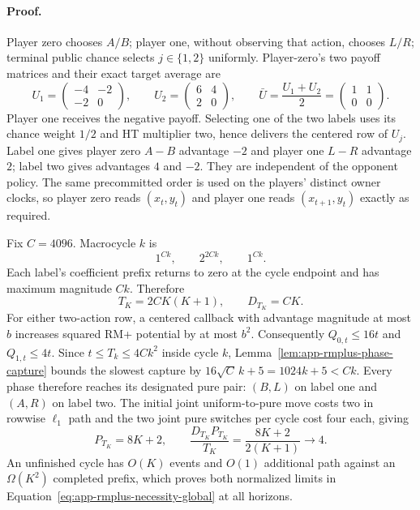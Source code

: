 \paragraph{Proof.}
Player zero chooses $A/B$; player one, without observing that action, chooses
$L/R$; terminal public chance selects $j\in\{1,2\}$ uniformly.  Player-zero's
two payoff matrices and their exact target average are
\begin{equation}
U_1=\begin{pmatrix}-4&-2\\-2&0\end{pmatrix},\qquad
U_2=\begin{pmatrix}6&4\\2&0\end{pmatrix},\qquad
\bar U=\frac{U_1+U_2}{2}=\begin{pmatrix}1&1\\0&0\end{pmatrix}.
\label{eq:app-necessity-game}
\end{equation}
Player one receives the negative payoff.  Selecting one of the two labels
uses its chance weight $1/2$ and HT multiplier two, hence delivers the
centered row of $U_j$.  Label one gives player zero $A-B$ advantage $-2$ and
player one $L-R$ advantage $2$; label two gives advantages $4$ and $-2$.
They are independent of the opponent policy.  The same precommitted order is
used on the players' distinct owner clocks, so player zero reads $(x_t,y_t)$
and player one reads $(x_{t+1},y_t)$ exactly as required.

Fix $C=4096$.  Macrocycle $k$ is
\begin{equation}
1^{Ck},\qquad 2^{2Ck},\qquad 1^{Ck}.
\label{eq:app-necessity-order}
\end{equation}
Each label's coefficient prefix returns to zero at the cycle endpoint and
has maximum magnitude $Ck$.  Therefore
\begin{equation}
T_K=2CK(K+1),\qquad D_{T_K}=CK.
\label{eq:app-necessity-clocks}
\end{equation}
For either two-action row, a centered callback with advantage magnitude at
most $b$ increases squared RM+ potential by at most $b^2$.  Consequently
$Q_{0,t}\le16t$ and $Q_{1,t}\le4t$.  Since $t\le T_k\le4Ck^2$ inside cycle
$k$, Lemma~\ref{lem:app-rmplus-phase-capture} bounds the slowest capture by
$16\sqrt{C}\,k+5=1024k+5<Ck$.  Every phase therefore reaches its designated
pure pair: $(B,L)$ on label one and $(A,R)$ on label two.  The initial joint
uniform-to-pure move costs two in rowwise $\ell_1$ path and the two joint
pure switches per cycle cost four each, giving
\begin{equation}
P_{T_K}=8K+2,\qquad
\frac{D_{T_K}P_{T_K}}{T_K}=\frac{8K+2}{2(K+1)}\to4.
\label{eq:app-necessity-path}
\end{equation}
An unfinished cycle has $O(K)$ events and $O(1)$ additional path against an
$\Omega(K^2)$ completed prefix, which proves both normalized limits in
Equation~\ref{eq:app-rmplus-necessity-global} at all horizons.

